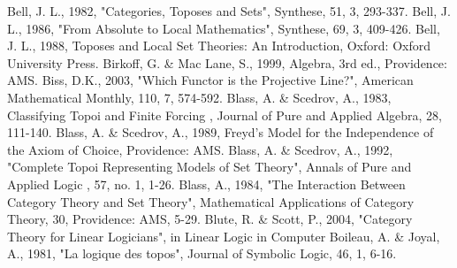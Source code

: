 \documentclass[12pt]{article}
\begin{document}
\begin{thebibliography}{199}
Bell, J. L., 1982, "Categories, Toposes and Sets", Synthese, 51, 3, 293-337. 
Bell, J. L., 1986, "From Absolute to Local Mathematics", Synthese, 69, 3, 409-426. 
Bell, J. L., 1988, Toposes and Local Set Theories: An Introduction, Oxford: Oxford University Press. 
Birkoff, G. \& Mac Lane, S., 1999, Algebra, 3rd ed., Providence: AMS.  
Biss, D.K., 2003, "Which Functor is the Projective Line?", American Mathematical Monthly, 110, 7, 574-592. 
Blass, A. \& Scedrov, A., 1983, Classifying Topoi and Finite Forcing , Journal of Pure and Applied Algebra, 28, 
111-140. 
Blass, A. \& Scedrov, A., 1989, Freyd's Model for the Independence of the Axiom of Choice, 
Providence: AMS.  
Blass, A. \& Scedrov, A., 1992, "Complete Topoi Representing Models of Set Theory", Annals of Pure and Applied Logic , 57, no. 1, 1-26.  
Blass, A., 1984, "The Interaction Between Category Theory and Set Theory", Mathematical Applications of Category Theory, 30, Providence: AMS, 5-29. 
Blute, R. \& Scott, P., 2004, "Category Theory for Linear Logicians", in Linear Logic in Computer 
Boileau, A. \& Joyal, A., 1981, "La logique des topos", Journal of Symbolic Logic, 46, 1, 6-16.  


\end{thebibliography}
\end{document}
